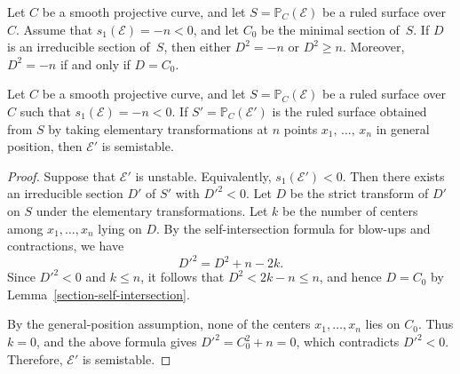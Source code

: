 \documentclass[10pt,a4paper]{amsart}
\newcommand{\Ee}{\mathcal{E}}
\newcommand{\PP}{\mathbb{P}}
\begin{document}
\begin{Lemma}\label{section-self-intersection}
Let $C$ be a smooth projective curve, and let $S=\PP_C(\Ee)$ be a ruled surface over $C$.
Assume that $s_1(\Ee)=-n<0$, and let $C_0$ be the minimal section of~$S$.
If $D$ is an irreducible section of~$S$, then either $D^2=-n$ or $D^2\geq n$.
Moreover, $D^2=-n$ if and only if $D=C_0$.
\end{Lemma}

\begin{Lemma}\label{unstable-to-semistable}
Let $C$ be a smooth projective curve, and let $S=\PP_C(\Ee)$ be a ruled surface over $C$ such that $s_1(\Ee)=-n<0$.
If $S'=\PP_C(\Ee')$ is the ruled surface obtained from $S$ by taking elementary transformations at $n$ points $x_1,\,\ldots,\,x_n$ in general position, then $\Ee'$ is semistable.
\end{Lemma}

\begin{proof}
Suppose that $\Ee'$ is unstable.
Equivalently, $s_1(\Ee')<0$.
Then there exists an irreducible section $D'$ of $S'$ with $D'^2<0$.
Let $D$ be the strict transform of $D'$ on $S$ under the elementary transformations.
Let $k$ be the number of centers among $x_1,\ldots,x_n$ lying on $D$.
By the self-intersection formula for blow-ups and contractions, we have
\[
D'^2=D^2+n-2k.
\]
Since $D'^2<0$ and $k\leq n$, it follows that $D^2<2k-n\leq n$, and hence $D=C_0$ by Lemma~\ref{section-self-intersection}.

By the general-position assumption, none of the centers $x_1,\ldots,x_n$ lies on $C_0$.
Thus $k=0$, and the above formula gives $D'^2=C_0^2+n=0$, which contradicts $D'^2<0$.
Therefore, $\Ee'$ is semistable.
\end{proof}
\end{document}
